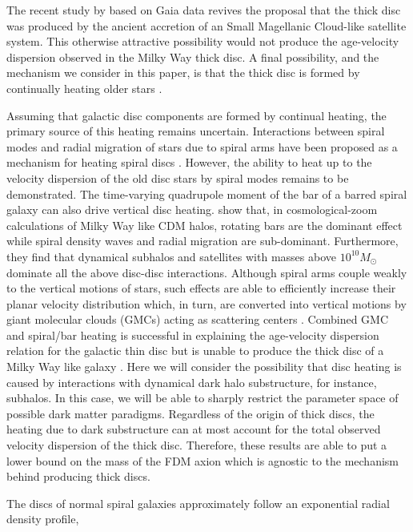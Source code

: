 \documentclass[usenatbib]{mnras}
\begin{document}
The recent study by \cite{gaia_normal_process} based on Gaia data revives the proposal that the thick disc was produced by the ancient accretion of an Small Magellanic Cloud-like satellite system. This otherwise attractive possibility would not produce the age-velocity dispersion observed in the Milky Way thick disc. 
A final possibility, and the mechanism we consider in this paper, is that the thick disc is formed by continually heating older stars \citep{thin-and-thick-disc}. 
\par 
Assuming that galactic disc components are formed by continual heating, the primary source of this heating remains uncertain. Interactions between spiral modes and radial migration of stars due to spiral arms have been proposed as a mechanism for heating spiral discs \citep{radial_migration}. However, the ability to heat up to the velocity dispersion of the old disc stars by spiral modes remains to be demonstrated. The time-varying quadrupole moment of the bar of a barred spiral galaxy can also drive vertical disc heating. \cite{vertical_heating_modes} show that, in cosmological-zoom calculations of Milky Way like CDM halos, rotating bars are the dominant effect while spiral density waves and radial migration are sub-dominant. Furthermore, they find that dynamical subhalos and satellites with masses above $10^{10} M_{\odot}$ dominate all the above disc-disc interactions. 
Although spiral arms couple weakly to the vertical motions of stars, such effects are able to efficiently increase their planar velocity distribution which, in turn, are converted into vertical motions by giant molecular clouds (GMCs) acting as scattering centers \citep{vertical_structure_and_GMC}. Combined GMC and spiral/bar heating is successful in explaining the age-velocity dispersion relation for the galactic thin disc but is unable to produce the thick disc of a Milky Way like galaxy \citep{heating_history}.
Here we will consider the possibility that disc heating is caused by interactions with dynamical dark halo substructure, for instance, subhalos. In this case, we will be able to sharply restrict the parameter space of possible dark matter paradigms. Regardless of the origin of thick discs, the heating due to dark substructure can at most account for the total observed velocity dispersion of the thick disc. Therefore, these results are able to put a lower bound on the mass of the FDM axion which is agnostic to the mechanism behind producing thick discs.
\par
The discs of normal spiral galaxies approximately follow an exponential radial density profile,
\end{document}

